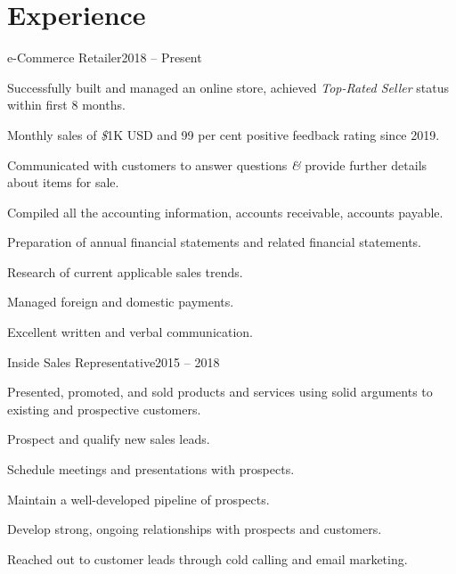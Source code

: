 \documentclass[letter]{resume}
\begin{document}
\section{Experience}
\begin{content}

\begin{position}{e-Commerce Retailer}{2018 – Present}{}{}{}
  \item Successfully built and managed an online store, achieved {\emph{Top-Rated Seller}} status within first 8 months.
  \item Monthly sales of {\em\$}1K USD and 99 per cent positive feedback rating since 2019.
  \item Communicated with customers to answer questions {\em\&} provide further details about items for sale. 
  \item Compiled all the accounting information, accounts receivable, accounts payable.
  \item Preparation of annual financial statements and related financial statements.
  \item Research of current applicable sales trends.
  \item Managed foreign and domestic payments.
  \item Excellent written and verbal communication.
  
\end{position}
\vspace{-.0001 \baselineskip}

\begin{position}{Inside Sales Representative}{2015 – 2018}{}{}{}
  \item Presented, promoted, and sold products and services using solid arguments to existing and prospective customers.
  \item Prospect and qualify new sales leads.
  \item Schedule meetings and presentations with prospects.
  \item Maintain a well-developed pipeline of prospects.
  \item Develop strong, ongoing relationships with prospects and customers.
  \item Reached out to customer leads through cold calling and email marketing.
\end{position}
\vspace{-.5\baselineskip}

\sectionlineskip
\end{content}
\end{document}
